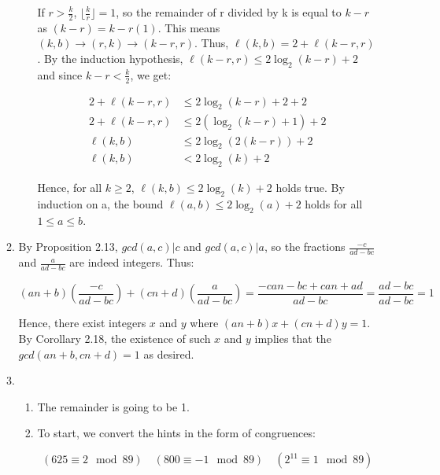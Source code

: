 \documentclass{article}
\begin{document}
\begin{enumerate}[leftmargin=*, label=\arabic*.]
\begin{enumerate}[label=\alph*)]
\begin{enumerate}[label=\alph*)]
        If $r > \frac{k}{2}$, $\lfloor \frac{k}{r} \rfloor = 1$, so the remainder of r divided by k is equal to $k - r$ as $(k - r) = k - r(1)$. This means $(k, b) \xrightarrow{} (r, k) \xrightarrow{} (k - r, r)$. Thus, $\ell(k, b) = 2 + \ell(k -r, r)$. By the induction hypothesis, $\ell(k - r, r) \leq 2\log_2(k - r) + 2$ and since $k - r < \frac{k}{2}$, we get: 
        
        \begin{align*}
              2 + \ell(k - r, r) &\leq 2\log_2(k - r) + 2 + 2 \\
              2 + \ell(k - r, r) &\leq 2(\log_2(k - r) + 1) + 2 \\
              \ell(k, b) &\leq 2\log_2(2(k - r)) + 2 \\ 
              \ell(k, b) &< 2\log_2(k) + 2 
        \end{align*}
        
        Hence, for all $k \geq 2$, $\ell(k, b) \leq 2\log_2(k) + 2$ holds true. By induction on a, the bound $\ell(a, b) \leq 2\log_2(a) + 2$ holds for all $1 \leq a \leq b$. \\
        
    \end{enumerate}
    \newpage

  \item 

  By Proposition 2.13, $gcd(a, c)|c$ and $gcd(a, c)|a$, so the fractions $\frac{-c}{ad - bc}$ and $\frac{a}{ad - bc}$ are indeed integers. Thus: 

  $$(an + b)(\frac{-c}{ad - bc}) + (cn + d)(\frac{a}{ad-bc}) = \frac{-can - bc + can + ad}{ad-bc} = \frac{ad-bc}{ad-bc} = 1$$

  Hence, there exist integers $x$ and $y$ where $(an + b)x + (cn+d)y = 1$. By Corollary 2.18, the existence of such $x$ and $y$ implies that the $gcd(an+b, cn+d) = 1$ as desired. \\

  \newpage

  \item 

  \begin{enumerate}[label=\alph*)]
        \item 
        The remainder is going to be 1. \\
        
        \item
        To start, we convert the hints in the form of congruences: 

        $$
        (625 \equiv 2 \mod 89) \quad
        (800 \equiv -1 \mod 89) \quad
        (2^{11} \equiv 1 \mod 89)
        $$
        

\end{enumerate}
\end{enumerate}
\end{enumerate}
\end{document}
